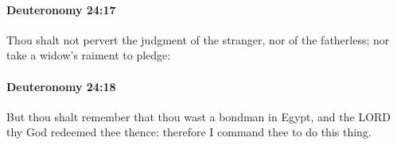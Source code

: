 		\paragraph{Deuteronomy 24:17} %
			\label{DEUTERONOMY-24-17}

			Thou shalt not pervert the judgment of the stranger, nor of the fatherless; nor take a widow's raiment to pledge:


		\paragraph{Deuteronomy 24:18} %
			\label{DEUTERONOMY-24-18}

			But thou shalt remember that thou wast a bondman in Egypt, and the LORD thy God redeemed thee thence: therefore I command thee to do this thing.


